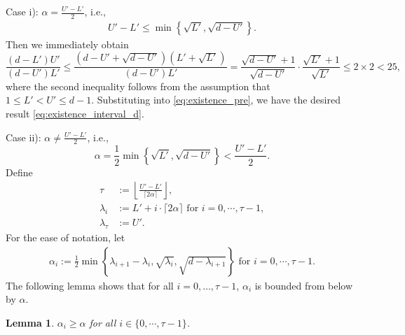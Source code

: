 \documentclass[onecolumn,letterpaper]{IEEEtran}
\newtheorem{lemma}{Lemma}
\newcommand{\up}{{U}}
\newcommand{\lw}{{L}}
\newcommand{\ap}{{\alpha}}
\newcommand{\exi}{{i}}
\newcommand{\sig}{{\lambda}}
\newcommand{\sigi}{{\sig_{\exi}}}
\newcommand{\sigio}{{\sig_{\exi+1}}}
\newcommand{\sigt}{{\sig_{\ta}}}
\newcommand{\ta}{{\tau}}
\newcommand{\alp}{{\ap}}
\newcommand{\alpi}{{\alp_{\exi}}}
\begin{document}
Case i): $\ap=\frac {\up'-\lw'} {2}$, i.e., 
\begin{align}
\up'-\lw' \leq \min\left\{ \sqrt{\lw'} , \sqrt{d-\up'} \right\}.
\end{align}
Then we immediately obtain
\begin{equation}
    \frac{(d-\lw')\up'}{(d-\up')\lw'} \le \frac{(d-\up' + \sqrt{d-\up'})(\lw' + \sqrt{\lw'})}{(d-\up')\lw'}  = \frac{ \sqrt{d-\up'} +1}{ \sqrt{d-\up'}}\cdot \frac{\sqrt{\lw'} + 1}{\sqrt{\lw'}}\le 2\times 2 < 25,
\end{equation}
where the second inequality follows from the assumption that $ 1 \le \lw' < \up' \le d-1$.
Substituting into \eqref{eq:existence_pre}, we have the desired result \eqref{eq:existence_interval_d}. 

Case ii): $\ap\neq \frac {\up'-\lw'} {2}$, i.e., %
\begin{equation}
\label{eq:case2:alpha}
    \ap = \frac{1}{2} \min\left\{ \sqrt{\lw'} , \sqrt{d-\up'}\right \} < \frac{\up'-\lw'}{2}. 
\end{equation}
Define 
\begin{align}
\ta &:= \left\lfloor \frac{\up'-\lw'}{\lceil 2\alp \rceil} \right\rfloor,\\
\sigi &:= \lw' + \exi\cdot\lceil 2\alp \rceil    \text { for } \exi = 0,\cdots, \ta-1,\label{eq:def:sigma}\\
\sigt &:= \up'.
\end{align}
 For the ease of notation, let 
 \begin{align}
 \label{eq:def:alpha:i}
 \alpi := \frac{1}{2} \min\left\{ \sigio-\sigi , \sqrt{\sigi} , \sqrt{d-\sigio}\right \}  \text { for }  \exi = 0,  \cdots , \ta-1. 
 \end{align}
The following lemma shows that for all $i=0,\dots, \ta-1$, $\alpi$ is bounded from below by $\ap$.
\begin{lemma} 
\label{lem:exi:alp}
$\alpi \ge \alp$ for all $\exi \in \{0,\cdots, \ta-1\}$. 
\end{lemma}
\end{document}
